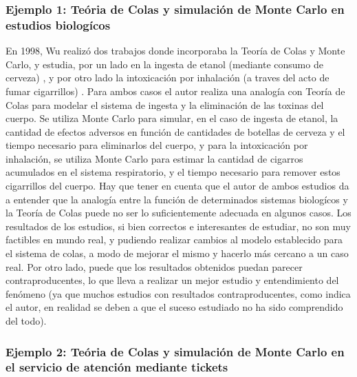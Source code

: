 \subsubsection{Ejemplo 1: Teória de Colas y simulación de Monte Carlo en estudios biologícos}

\noindent En 1998, Wu realizó dos trabajos donde incorporaba la Teoría de Colas y Monte Carlo, y estudia, por un lado en la ingesta de etanol (mediante consumo de cerveza) \citep{wu1998eth}, y por otro lado la intoxicación por inhalación (a traves del acto de fumar cigarrillos) \citep{wu1998inh}. Para ambos casos el autor realiza una analogía con Teoría de Colas para modelar el sistema de ingesta y la eliminación de las toxinas del cuerpo. Se utiliza Monte Carlo para simular, en el caso de ingesta de etanol, la cantidad de efectos adversos en función de cantidades de botellas de cerveza y el tiempo necesario para eliminarlos del cuerpo, y para la intoxicación por inhalación, se utiliza Monte Carlo para estimar la cantidad de cigarros acumulados en el sistema respiratorio, y el tiempo necesario para remover estos cigarrillos del cuerpo.
\newline \newline
Hay que tener en cuenta que el autor de ambos estudios da a entender que la analogía entre la función de determinados sistemas biologícos y la Teoría de Colas puede no ser lo suficientemente adecuada en algunos casos. Los resultados de los estudios, si bien correctos e interesantes de estudiar, no son muy factibles en mundo real, y pudiendo realizar cambios al modelo establecido para el sistema de colas, a modo de mejorar el mismo y hacerlo más cercano a un caso real. Por otro lado, puede que los resultados obtenidos puedan parecer contraproducentes, lo que lleva a realizar un mejor estudio y entendimiento del fenómeno (ya que muchos estudios con resultados contraproducentes, como indica el autor, en realidad se deben a que el suceso estudiado no ha sido comprendido del todo).

\subsubsection{Ejemplo 2: Teória de Colas y simulación de Monte Carlo en el servicio de atención mediante tickets}

